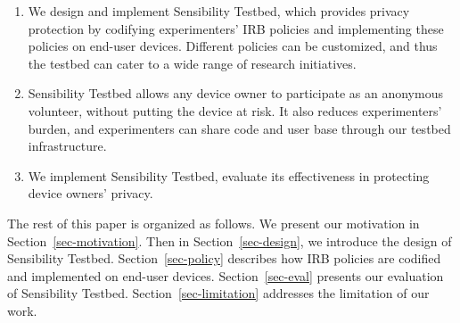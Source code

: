 \begin{enumerate}

\item We design and implement Sensibility Testbed, which provides privacy protection by 
codifying experimenters' IRB policies and implementing 
these policies on end-user devices. Different policies can 
be customized, and thus the testbed can cater to a wide 
range of research initiatives.


\item Sensibility Testbed allows any device owner to participate 
as an anonymous volunteer, without putting the device at risk. 
It also reduces experimenters' burden, and experimenters can share 
code and user base through our testbed infrastructure.


\item We implement Sensibility Testbed, evaluate its effectiveness
in protecting device owners' privacy. 
\end{enumerate}

The rest of this paper is organized as follows. We present our
motivation in Section~\ref{sec-motivation}. Then in Section~\ref{sec-design}, 
we introduce the design of Sensibility Testbed. Section~\ref{sec-policy}
describes how IRB policies are codified and implemented on end-user
devices. Section~\ref{sec-eval} presents our evaluation of Sensibility 
Testbed. Section~\ref{sec-limitation} addresses the limitation of our work.
